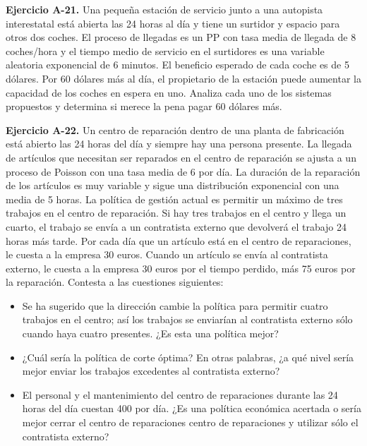 \documentclass[
]{book}
\providecommand{\tightlist}{%
  \setlength{\itemsep}{0pt}\setlength{\parskip}{0pt}}
\theoremstyle{definition}
\theoremstyle{definition}
\theoremstyle{definition}
\theoremstyle{definition}
\theoremstyle{remark}
\begin{document}
\textbf{Ejercicio A-21.} Una pequeña estación de servicio junto a una autopista interestatal está abierta las 24 horas al día y tiene un surtidor y espacio para otros dos coches. El proceso de llegadas es un PP con tasa media de llegada de 8 coches/hora y el tiempo medio de servicio en el surtidores es una variable aleatoria exponencial de 6 minutos. El beneficio esperado de cada coche es de 5 dólares. Por 60 dólares más al día, el propietario de la estación puede aumentar la capacidad de los coches en espera en uno. Analiza cada uno de los sistemas propuestos y determina si merece la pena pagar 60 dólares más.

\textbf{Ejercicio A-22.} Un centro de reparación dentro de una planta de fabricación está abierto las 24 horas del día y siempre hay una persona presente. La llegada de artículos que necesitan ser reparados en el centro de reparación se ajusta a un proceso de Poisson con una tasa media de 6 por día. La duración de la reparación de los artículos es muy variable y sigue una distribución exponencial con una media de 5 horas. La política de gestión actual es permitir un máximo de tres trabajos en el centro de reparación. Si hay tres trabajos en el centro y llega un cuarto, el trabajo se envía a un contratista externo que devolverá el trabajo 24 horas más tarde. Por cada día que un artículo está en el centro de reparaciones, le cuesta a la empresa 30 euros. Cuando un artículo se envía al contratista externo, le cuesta a la empresa 30 euros por el tiempo perdido, más 75 euros por la reparación. Contesta a las cuestiones siguientes:

\begin{itemize}
\tightlist
\item
  Se ha sugerido que la dirección cambie la política para permitir cuatro trabajos en el centro; así los trabajos se enviarían al contratista externo sólo cuando haya cuatro presentes. ¿Es esta una política mejor?
\item
  ¿Cuál sería la política de corte óptima? En otras palabras, ¿a qué nivel sería mejor enviar los trabajos excedentes al contratista externo?
\item
  El personal y el mantenimiento del centro de reparaciones durante las 24 horas del día cuestan 400 por día. ¿Es una política económica acertada o sería mejor cerrar el centro de reparaciones centro de reparaciones y utilizar sólo el contratista externo?
\end{itemize}
\end{document}
